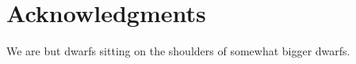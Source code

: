 \cleartorecto %
\chapter{Acknowledgments} %
\thispagestyle{plain} %

We are but dwarfs sitting on the shoulders of somewhat bigger dwarfs.
